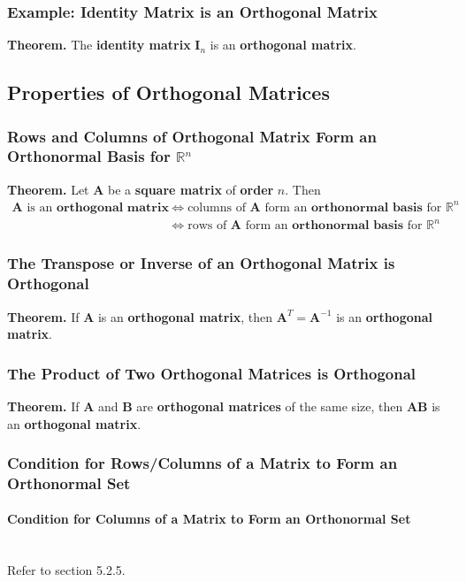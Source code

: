 \documentclass[../ma2001_notes.tex]{subfiles}
\begin{document}
\subsubsection{Example: Identity Matrix is an Orthogonal Matrix}
\textbf{Theorem.} The \textbf{identity matrix} \(\bm{I}_n\) is an \textbf{orthogonal matrix}.

\subsection{Properties of Orthogonal Matrices}
\subsubsection{Rows and Columns of Orthogonal Matrix Form an Orthonormal Basis for $\mathbb{R}^n$}
\textbf{Theorem.} Let \(\bm{A}\) be a \textbf{square matrix} of \textbf{order} \(n\). Then
\begin{align*}
	\bm{A}\text{ is an }\textbf{orthogonal matrix}
	&\Leftrightarrow\text{columns of }\bm{A}\text{ form an }\textbf{orthonormal basis}\text{ for }\mathbb{R}^n \\
	&\Leftrightarrow\text{rows of }\bm{A}\text{ form an }\textbf{orthonormal basis}\text{ for }\mathbb{R}^n
\end{align*}

\subsubsection{The Transpose or Inverse of an Orthogonal Matrix is Orthogonal}
\textbf{Theorem.} If \(\bm{A}\) is an \textbf{orthogonal matrix}, then \(\bm{A}^T=\bm{A}^{-1}\) is an \textbf{orthogonal matrix}.

\subsubsection{The Product of Two Orthogonal Matrices is Orthogonal}
\textbf{Theorem.} If \(\bm{A}\) and \(\bm{B}\) are \textbf{orthogonal matrices} of the same size, then \(\bm{AB}\) is an \textbf{orthogonal matrix}.

\subsubsection{Condition for Rows/Columns of a Matrix to Form an Orthonormal Set}

\paragraph{Condition for Columns of a Matrix to Form an Orthonormal Set}\,\\
Refer to section 5.2.5.
\end{document}

